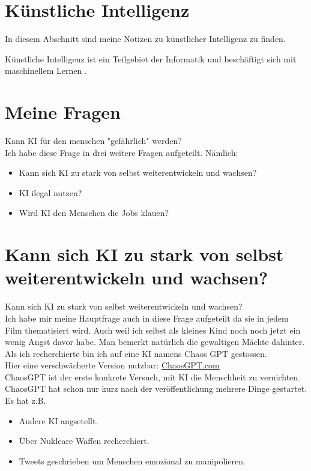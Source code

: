 \section{Künstliche Intelligenz}
\label{sec:ai}

In diesem Abschnitt sind meine Notizen zu künstlicher Intelligenz zu finden.

Künstliche Intelligenz ist ein Teilgebiet der Informatik und beschäftigt sich mit maschinellem Lernen \citep{ai-wikipedia}.
\section{Meine Fragen}
Kann KI für den menschen "gefährlich" werden?
\\
Ich habe diese Frage in drei weitere Fragen aufgeteilt.
\newline Nämlich: 
\begin{itemize}
    \item Kann sich KI zu stark von selbst weiterentwickeln und wachsen?
    \item KI ilegal nutzen?
    \item Wird KI den Menschen die Jobs klauen?
\end{itemize}
\section{Kann sich KI zu stark von selbst weiterentwickeln und wachsen?}
Kann sich KI zu stark von selbst weiterentwickeln und wachsen?
\\
Ich habe mir meine Hauptfrage auch in diese Frage aufgeteilt da sie in jedem Film thematisiert wird. 
Auch weil ich selbst als kleines Kind noch noch jetzt ein wenig Angst davor habe. 
Man bemerkt natürlich die gewaltigen Mächte dahinter. Als ich recherchierte bin ich auf eine KI namens Chaos GPT gestossen.
\\
Hier eine verschwächerte Version nutzbar: \href{https://flowgpt.com/p/chaosgpt}{ChaosGPT.com}
\\
ChaosGPT ist der erste konkrete Versuch, mit KI die Menschheit zu vernichten. \citep{the-decoder}
ChaosGPT hat schon nur kurz nach der veröffentlichung mehrere Dinge gestartet. Es hat z.B.
\begin{itemize}
    \item Andere KI angsetellt.
    \item Über Nukleare Waffen recherchiert.
    \item Tweets geschrieben um Menschen emozional zu manipolieren.
\end{itemize}

